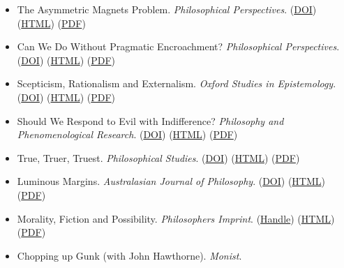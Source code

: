 \documentclass[
  10pt,
  letterpaper,
  DIV=11,
  numbers=noendperiod,
  twoside]{scrartcl}
\begin{document}
\begin{itemize}
{  Society}. (\href{http://dx.doi.org/10.2139/ssrn.997944}{DOI})
  (\href{./posts/bayesdog/the-bayesian-and-the-dogmatist.qmd}{HTML})
  (\href{./posts/bayesdog/The\%20Bayesian\%20and\%20the\%20Dogmatist.pdf}{PDF})
\item
  The Asymmetric Magnets Problem. \emph{Philosophical Perspectives}.
  (\href{http://dx.doi.org/10.1111/j.1520-8583.2006.00116.x}{DOI})
  (\href{./posts/tamp/the-asymmetric-magnets-problem.html}{HTML})
  (\href{./posts/tamp/The\%20Asymmetric\%20Magnets\%20Problem.pdf}{PDF})
\item
  Can We Do Without Pragmatic Encroachment? \emph{Philosophical
  Perspectives}.
  (\href{http://dx.doi.org/10.1111/j.1520-8583.2005.00068.x}{DOI})
  (\href{./posts/cwpwpe/can-we-do-without-pragmatic-encroachment.html}{HTML})
  (\href{./posts/cwpwpe/Can\%20We\%20Do\%20Without\%20Pragmatic\%20Encroachment?.pdf}{PDF})
\item
  Scepticism, Rationalism and Externalism. \emph{Oxford Studies in
  Epistemology}.
  (\href{https://doi.org/10.1093/oso/9780199285891.003.0011}{DOI})
  (\href{./posts/sre/scepticism-rationalism-and-externalism.html}{HTML})
  (\href{./posts/sre/Scepticism,\%20Rationalism,\%20and\%20Externalism.pdf}{PDF})
\item
  Should We Respond to Evil with Indifference? \emph{Philosophy and
  Phenomenological Research}.
  (\href{http://dx.doi.org/10.1111/j.1933-1592.2005.tb00417.x}{DOI})
  (\href{./posts/evil/should-we-respond-to-evil-with-indifference.qmd}{HTML})
  (\href{./posts/evil/Should\%20We\%20Respond\%20to\%20Evil\%20With\%20Indifference?.pdf}{PDF})
\item
  True, Truer, Truest. \emph{Philosophical Studies}.
  (\href{http://dx.doi.org/10.1007/s11098-004-5218-x}{DOI})
  (\href{./posts/ttt/true-truer-truest.html}{HTML})
  (\href{./posts/ttt/True,\%20Truer,\%20Truest.pdf}{PDF})
\item
  Luminous Margins. \emph{Australasian Journal of Philosophy}.
  (\href{https://doi.org/10.1080/713659874}{DOI})
  (\href{./posts/lummarg/luminous-margins.html}{HTML})
  (\href{./posts/lummarg/Luminous\%20Margins.pdf}{PDF})
\item
  Morality, Fiction and Possibility. \emph{Philosophers Imprint}.
  (\href{http://hdl.handle.net/2027/spo.3521354.0004.003}{Handle})
  (\href{./posts/mfp/morality-fiction-and-possibility.html}{HTML})
  (\href{./posts/mfp/Morality,\%20Fiction\%20and\%20Possibility.pdf}{PDF})
\item
  Chopping up Gunk (with John Hawthorne). \emph{Monist}.

\end{itemize}
\end{document}
